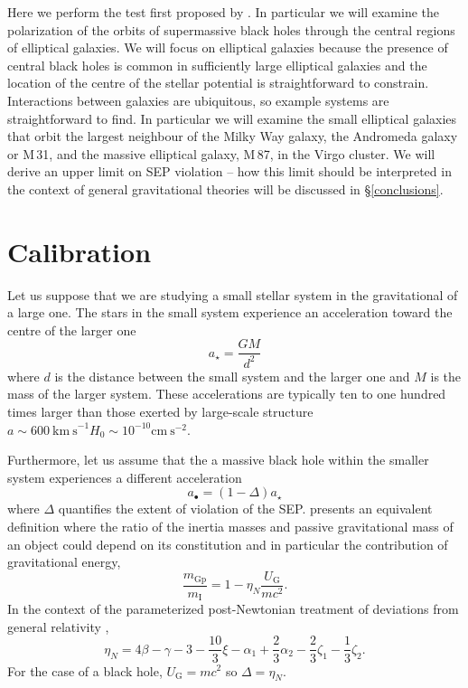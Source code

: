 \documentclass[useAMS,usenatbib]{mn2e}
\begin{document}
Here we perform the test first proposed by \cite{2012PhRvL.109e1304H}.
In particular we will examine the polarization of the orbits of
supermassive black holes through the central regions of elliptical
galaxies.  We will focus on elliptical galaxies because the presence
of central black holes is common in sufficiently large elliptical
galaxies and the location of the centre of the stellar potential is
straightforward to constrain.  Interactions between galaxies are
ubiquitous, so example systems are straightforward to find.  In
particular we will examine the small elliptical galaxies that orbit
the largest neighbour of the Milky Way galaxy, the Andromeda galaxy or
M\,31, and the massive elliptical galaxy, M\,87, in the Virgo cluster.
We will derive an upper limit on SEP violation -- how this limit
should be interpreted in the context of general gravitational theories
will be discussed in \S \ref{conclusions}.

\section{Calibration}

Let us suppose that we are studying a small stellar system in the
gravitational of a large one.  The stars in the small system
experience an acceleration toward the centre of the larger one
\begin{equation}
  a_\star = \frac{GM}{d^2}
  \label{eq:1}
\end{equation}
where $d$ is the distance between the small system and the larger one
and $M$ is the mass of the larger system.  These accelerations are
typically ten to one hundred times larger than those exerted by
large-scale structure $a \sim 600~\mathrm{km~s}^{-1} H_0 \sim 10^{-10}
\mathrm{cm~s}^{-2}$.

Furthermore, let us assume that the a massive black hole within the
smaller system experiences a different acceleration
\begin{equation}
  a_\bullet = \left ( 1 - \Delta \right ) a_\star
  \label{eq:2}
\end{equation}
where $\Delta$ quantifies the extent of violation of the
SEP. \citet{1982RPPh...45..631N} presents an equivalent definition
where the ratio of the inertia masses and passive gravitational mass
of an object could depend on its constitution and in particular the
contribution of gravitational energy,
\begin{equation}
  \frac{m_\mathrm{Gp}}{m_\mathrm{I}} = 1- \eta_N \frac{U_\mathrm{G}}{mc^2}.
  \label{eq:14}
\end{equation}
In the context of the parameterized post-Newtonian treatment of
deviations from general relativity \citep{Will:lrr},
\begin{equation}
  \eta_{N} =4\beta−\gamma − 3− \frac{10}{3} \xi - \alpha_1 +
  \frac{2}{3} \alpha_2 - \frac{2}{3} \zeta_1 - \frac{1}{3} \zeta_2.
\end{equation}
For the case of a black hole, $U_\mathrm{G} = mc^2$ so
$\Delta=\eta_N$. 
\end{document}
